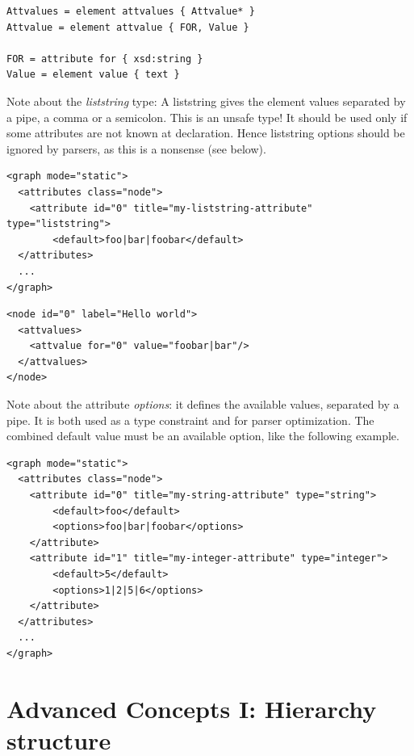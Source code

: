 \documentclass[a4paper,10pt]{article}
\begin{document}
\lstset{ style=rnc }
\begin{lstlisting}[caption={Attribute Values Specification},label=attributeValuesRNC]
Attvalues = element attvalues { Attvalue* }
Attvalue = element attvalue { FOR, Value }

FOR = attribute for { xsd:string }
Value = element value { text }
\end{lstlisting}

Note about the \textit{liststring} type: A liststring gives the element values separated by a pipe, a comma or a semicolon. This is an unsafe type! It should be used only if some attributes are not known at declaration. Hence liststring options should be ignored by parsers, as this is a nonsense (see below).

\lstset{ style=gexf }
\begin{lstlisting}[caption={Liststring Definition},label=liststringDef]
<graph mode="static">
  <attributes class="node">
    <attribute id="0" title="my-liststring-attribute" type="liststring">
        <default>foo|bar|foobar</default>
  </attributes>
  ...
</graph>
\end{lstlisting}

\lstset{ style=gexf }
\begin{lstlisting}[caption={Liststring usage},label=liststringUse]
<node id="0" label="Hello world">
  <attvalues>
    <attvalue for="0" value="foobar|bar"/>
  </attvalues>
</node>
\end{lstlisting}

Note about the attribute \textit{options}: it defines the available values, separated by a pipe. It is both used as a type constraint and for parser optimization. The combined default value must be an available option, like the following example.

\lstset{ style=gexf }
\begin{lstlisting}[caption={Optionsn},label=optionsDef]
<graph mode="static">
  <attributes class="node">
    <attribute id="0" title="my-string-attribute" type="string">
        <default>foo</default>
        <options>foo|bar|foobar</options>
    </attribute>
    <attribute id="1" title="my-integer-attribute" type="integer">
        <default>5</default>
        <options>1|2|5|6</options>
    </attribute>
  </attributes>
  ...
</graph>
\end{lstlisting}

\section{Advanced Concepts I: Hierarchy structure} \label{hierarchy}
\end{document}
